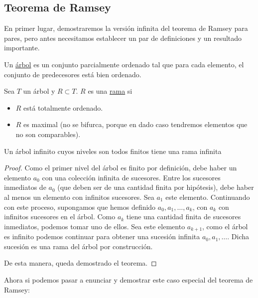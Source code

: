 \subsection{Teorema de Ramsey}

En primer lugar, demostraremos la versión infinita del teorema de Ramsey para pares, pero antes necesitamos establecer un par de definiciones y un resultado importante.

\begin{defn}
    Un \ul{árbol} es un conjunto parcialmente ordenado tal que para cada elemento, el conjunto de predecesores está bien ordenado.
\end{defn}

\begin{defn}
    Sea $T$ un árbol y $R \subset T$. $R$ es una \ul{rama} si
        
    \begin{itemize}
        \item $R$ está totalmente ordenado.
        \item $R$ es maximal (no se bifurca, porque en dado caso tendremos elementos que no son comparables).
    \end{itemize}
\end{defn}

\begin{teo}[König]\label{teo:arboles1}
    Un árbol infinito cuyos niveles son todos finitos tiene una rama infinita
\end{teo}

\begin{proof}
    Como el primer nivel del árbol es finito por definición, debe haber un elemento $a_0$ con una colección infinita de sucesores. Entre los sucesores inmediatos de $a_0$ (que deben ser de una cantidad finita por hipótesis), debe haber al menos un elemento con infinitos sucesores. Sea $a_1$ este elemento. Continuando con este proceso, supongamos que hemos definido $a_0, a_1, \dots, a_k$, con $a_k$ con infinitos sucesores en el árbol. Como $a_k$ tiene una cantidad finita de sucesores inmediatos, podemos tomar uno de ellos. Sea este elemento $a_{k+1}$, como el árbol es infinito podemos continuar para obtener una sucesión infinita $a_0, a_1, \dots$. Dicha sucesión es una rama del árbol por construcción.
    
    De esta manera, queda demostrado el teorema.
\end{proof}

Ahora si podemos pasar a enunciar y demostrar este caso especial del teorema de Ramsey:

